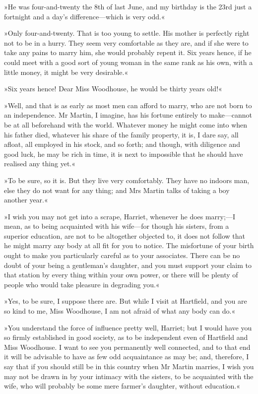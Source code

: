 »He was four-and-twenty the 8th of last June, and my birthday is the 23rd just a fortnight and a day's difference—which is very odd.«

»Only four-and-twenty. That is too young to settle. His mother is perfectly right not to be in a hurry. They seem very comfortable as they are, and if she were to take any pains to marry him, she would probably repent it. Six years hence, if he could meet with a good sort of young woman in the same rank as his own, with a little money, it might be very desirable.«

»Six years hence! Dear Miss Woodhouse, he would be thirty years old!«

»Well, and that is as early as most men can afford to marry, who are not born to an independence. Mr Martin, I imagine, has his fortune entirely to make—cannot be at all beforehand with the world. Whatever money he might come into when his father died, whatever his share of the family property, it is, I dare say, all afloat, all employed in his stock, and so forth; and though, with diligence and good luck, he may be rich in time, it is next to impossible that he should have realised any thing yet.«

»To be sure, so it is. But they live very comfortably. They have no indoors man, else they do not want for any thing; and Mrs Martin talks of taking a boy another year.«

»I wish you may not get into a scrape, Harriet, whenever he does marry;—I mean, as to being acquainted with his wife—for though his sisters, from a superior education, are not to be altogether objected to, it does not follow that he might marry any body at all fit for you to notice. The misfortune of your birth ought to make you particularly careful as to your associates. There can be no doubt of your being a gentleman's daughter, and you must support your claim to that station by every thing within your own power, or there will be plenty of people who would take pleasure in degrading you.«

»Yes, to be sure, I suppose there are. But while I visit at Hartfield, and you are so kind to me, Miss Woodhouse, I am not afraid of what any body can do.«

»You understand the force of influence pretty well, Harriet; but I would have you so firmly established in good society, as to be independent even of Hartfield and Miss Woodhouse. I want to see you permanently well connected, and to that end it will be advisable to have as few odd acquaintance as may be; and, therefore, I say that if you should still be in this country when Mr Martin marries, I wish you may not be drawn in by your intimacy with the sisters, to be acquainted with the wife, who will probably be some mere farmer's daughter, without education.«

